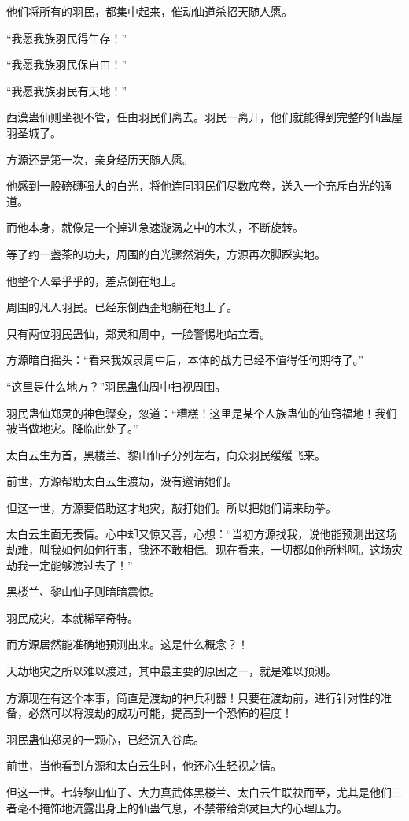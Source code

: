\begin{this_body}
他们将所有的羽民，都集中起来，催动仙道杀招天随人愿。

“我愿我族羽民得生存！”

“我愿我族羽民保自由！”

“我愿我族羽民有天地！”

西漠蛊仙则坐视不管，任由羽民们离去。羽民一离开，他们就能得到完整的仙蛊屋羽圣城了。

方源还是第一次，亲身经历天随人愿。

他感到一股磅礴强大的白光，将他连同羽民们尽数席卷，送入一个充斥白光的通道。

而他本身，就像是一个掉进急速漩涡之中的木头，不断旋转。

等了约一盏茶的功夫，周围的白光骤然消失，方源再次脚踩实地。

他整个人晕乎乎的，差点倒在地上。

周围的凡人羽民。已经东倒西歪地躺在地上了。

只有两位羽民蛊仙，郑灵和周中，一脸警惕地站立着。

方源暗自摇头：“看来我奴隶周中后，本体的战力已经不值得任何期待了。”

“这里是什么地方？”羽民蛊仙周中扫视周围。

羽民蛊仙郑灵的神色骤变，忽道：“糟糕！这里是某个人族蛊仙的仙窍福地！我们被当做地灾。降临此处了。”

太白云生为首，黑楼兰、黎山仙子分列左右，向众羽民缓缓飞来。

前世，方源帮助太白云生渡劫，没有邀请她们。

但这一世，方源要借助这才地灾，敲打她们。所以把她们请来助拳。

太白云生面无表情。心中却又惊又喜，心想：“当初方源找我，说他能预测出这场劫难，叫我如何如何行事，我还不敢相信。现在看来，一切都如他所料啊。这场灾劫我一定能够渡过去了！”

黑楼兰、黎山仙子则暗暗震惊。

羽民成灾，本就稀罕奇特。

而方源居然能准确地预测出来。这是什么概念？！

天劫地灾之所以难以渡过，其中最主要的原因之一，就是难以预测。

方源现在有这个本事，简直是渡劫的神兵利器！只要在渡劫前，进行针对性的准备，必然可以将渡劫的成功可能，提高到一个恐怖的程度！

羽民蛊仙郑灵的一颗心，已经沉入谷底。

前世，当他看到方源和太白云生时，他还心生轻视之情。

但这一世。七转黎山仙子、大力真武体黑楼兰、太白云生联袂而至，尤其是他们三者毫不掩饰地流露出身上的仙蛊气息，不禁带给郑灵巨大的心理压力。


\end{this_body}
